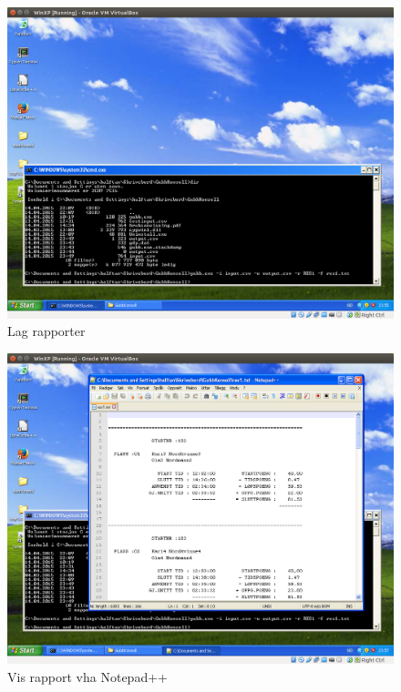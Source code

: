 \documentclass[12pt]{book}
\begin{document}
\begin{figure}[h]
\includegraphics[width=15cm]{018}
\caption{Lag rapporter}
\end{figure}

\begin{figure}[h]
\includegraphics[width=15cm]{019}
\caption{Vis rapport vha Notepad++}
\end{figure}
\end{document}
